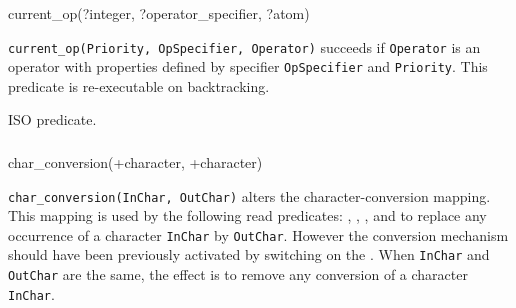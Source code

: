 \subsubsection{}

\begin{TemplatesOneCol}
current\_op(?integer, ?operator\_specifier, ?atom)

\end{TemplatesOneCol}

\Description

\texttt{current\_op(Priority, OpSpecifier, Operator)} succeeds if
\texttt{Operator} is an operator with properties defined by specifier
\texttt{OpSpecifier} and \texttt{Priority}. This predicate is re-executable
on backtracking.

\begin{PlErrors}




\end{PlErrors}

\Portability

ISO predicate.

\subsubsection{\label{char-conversion/2}}

\begin{TemplatesOneCol}
char\_conversion(+character, +character)

\end{TemplatesOneCol}

\Description

\texttt{char\_conversion(InChar, OutChar)} alters the character-conversion
mapping. This mapping is used by the following read predicates:
 , ,
,   and
  to replace any occurrence of a
character \texttt{InChar} by \texttt{OutChar}. However the conversion
mechanism should have been previously activated by switching on the
  . When
\texttt{InChar} and \texttt{OutChar} are the same, the effect is to remove
any conversion of a character \texttt{InChar}.

